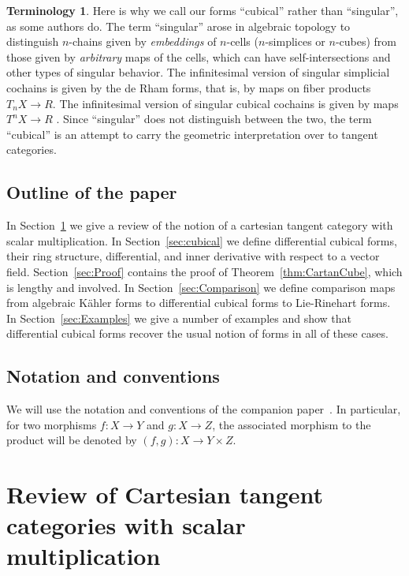 \documentclass[12pt,reqno, a4paper]{amsart}
\numberwithin{equation}{section}
\theoremstyle{plain}
\theoremstyle{definition}
\newtheorem{Terminology}[Theorem]{Terminology}
\theoremstyle{remark}
\begin{document}
\begin{Terminology}
Here is why we call our forms ``cubical'' rather than ``singular'', as some authors do. The term ``singular'' arose in algebraic topology to distinguish $n$-chains given by \emph{embeddings} of $n$-cells ($n$-simplices or $n$-cubes) from those given by \emph{arbitrary} maps of the cells, which can have self-intersections and other types of singular behavior. The infinitesimal version of singular simplicial cochains is given by the de Rham forms, that is, by maps on fiber products $T_n X \to R$. The infinitesimal version of singular cubical cochains \cite[Ch.~II]{Massey:1980} is given by maps $T^n X \to R$ \cite[\S I.14.2]{Kock:2006}. Since ``singular'' does not distinguish between the two, the term ``cubical'' is an attempt to carry the geometric interpretation over to tangent categories.
\end{Terminology}



\subsection{Outline of the paper}

In Section~\ref{sec:AbstractTangent} we give a review of the notion of a cartesian tangent category with scalar multiplication. In Section~\ref{sec:cubical} we define differential cubical forms, their ring structure, differential, and inner derivative with respect to a vector field. Section~\ref{sec:Proof} contains the proof of Theorem~\ref{thm:CartanCube}, which is lengthy and involved. In Section~\ref{sec:Comparison} we define comparison maps from algebraic K\"ahler forms to differential cubical forms to Lie-Rinehart forms. In Section~\ref{sec:Examples} we give a number of examples and show that differential cubical forms recover the usual notion of forms in all of these cases.



\subsection{Notation and conventions}

We will use the notation and conventions of the companion paper~\cite{AintablianBlohmann:2026}. In particular, for two morphisms $f: X \to Y$ and $g: X \to Z$, the associated morphism to the product will be denoted by $(f,g): X \to Y \times Z$.



\section{Review of Cartesian tangent categories with scalar multiplication}
\label{sec:AbstractTangent}
\end{document}
